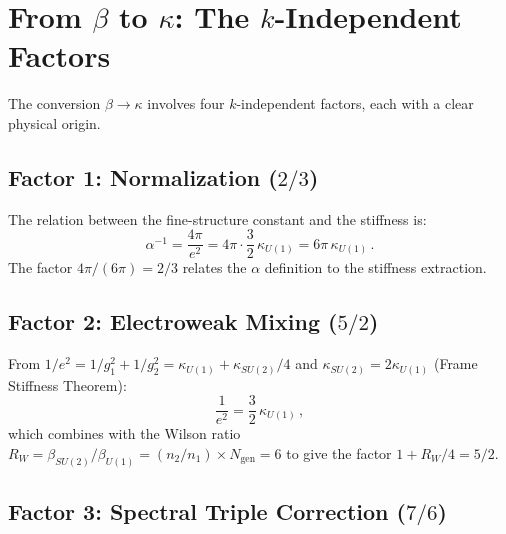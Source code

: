 \documentclass[12pt,a4paper]{article}
\theoremstyle{definition}
\theoremstyle{remark}
\begin{document}
\section{From $\beta$ to $\kappa$: The $k$-Independent Factors}
\label{sec:beta-to-kappa}

The conversion $\beta \to \kappa$ involves four $k$-independent factors,
each with a clear physical origin.

\subsection{Factor 1: Normalization ($2/3$)}

The relation between the fine-structure constant and the stiffness is:
\begin{equation}
\alpha^{-1} = \frac{4\pi}{e^2} = 4\pi \cdot \frac{3}{2}\,\kappa_{U(1)}
= 6\pi\,\kappa_{U(1)}\,.
\end{equation}
The factor $4\pi/(6\pi) = 2/3$ relates the $\alpha$ definition to the
stiffness extraction.

\subsection{Factor 2: Electroweak Mixing ($5/2$)}

From $1/e^2 = 1/g_1^2 + 1/g_2^2 = \kappa_{U(1)} + \kappa_{SU(2)}/4$
and $\kappa_{SU(2)} = 2\kappa_{U(1)}$ (Frame Stiffness Theorem):
\begin{equation}
\frac{1}{e^2} = \frac{3}{2}\,\kappa_{U(1)}\,,
\end{equation}
which combines with the Wilson ratio $R_W = \beta_{SU(2)}/\beta_{U(1)}
= (n_2/n_1) \times N_{\mathrm{gen}} = 6$ to give the factor
$1 + R_W/4 = 5/2$.

\subsection{Factor 3: Spectral Triple Correction ($7/6$)}
\end{document}
